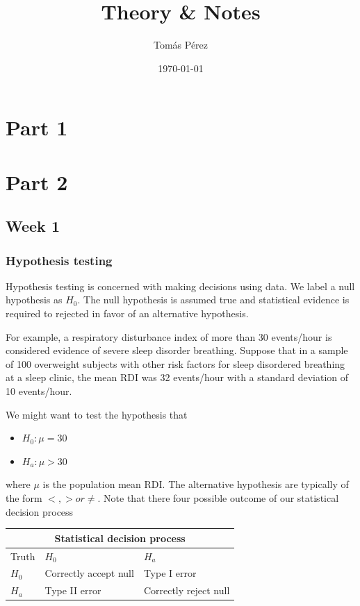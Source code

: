 \documentclass{homework}
\author{Tomás Pérez}
\date{\today}
\title{Theory \& Notes}
\begin{document}
 \maketitle

\section{Part 1}
\section{Part 2}
\subsection{Week 1}

\subsubsection{Hypothesis testing}

Hypothesis testing is concerned with making decisions using data. We label a null hypothesis as $H_0$. The null hypothesis is assumed true and statistical evidence is required to rejected in favor of an alternative hypothesis. 

For example, a respiratory disturbance index of more than 30 events/hour is considered evidence of severe sleep disorder breathing. Suppose that in a sample of 100 overweight subjects with other risk factors for sleep disordered breathing at a sleep clinic, the mean RDI was 32 events/hour with a standard deviation of 10 events/hour.

We might want to test the hypothesis that 

\begin{itemize}
    \item $H_0 : \mu = 30$ 
    \item $H_a : \mu > 30$ 
\end{itemize}

where $\mu$ is the population mean RDI. The alternative hypothesis are typically of the form $<,> or \neq$. Note that there four possible outcome of our statistical decision process

\begin{tabular}{ |p{1cm}||p{5cm}|p{5cm}|  }
 \hline
 \multicolumn{3}{|c|}{Statistical decision process} \\
 \hline
 Truth& $H_0$ & $H_a$\\
 \hline
 $H_0$  & Correctly accept null & Type I error\\
 $H_a$ &  Type II error & Correctly reject null\\
 \hline
\end{tabular} \\
\end{document}
